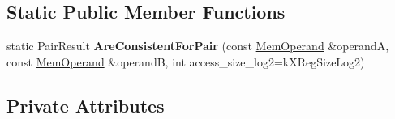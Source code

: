 \subsection*{Static Public Member Functions}
\begin{DoxyCompactItemize}
\item 
static Pair\+Result {\bfseries Are\+Consistent\+For\+Pair} (const \hyperlink{classv8_1_1internal_1_1_mem_operand}{Mem\+Operand} \&operandA, const \hyperlink{classv8_1_1internal_1_1_mem_operand}{Mem\+Operand} \&operandB, int access\+\_\+size\+\_\+log2=k\+X\+Reg\+Size\+Log2)\hypertarget{classv8_1_1internal_1_1_mem_operand_ade2082eb65c99187fad7a281b2311849}{}\label{classv8_1_1internal_1_1_mem_operand_ade2082eb65c99187fad7a281b2311849}

\end{DoxyCompactItemize}
\subsection*{Private Attributes}
